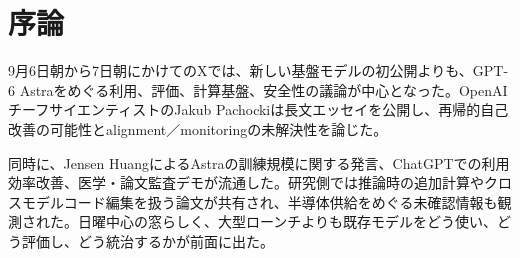 \section{序論}
9月6日朝から7日朝にかけてのXでは、新しい基盤モデルの初公開よりも、GPT-6 Astraをめぐる利用、評価、計算基盤、安全性の議論が中心となった。OpenAIチーフサイエンティストのJakub Pachockiは長文エッセイを公開し、再帰的自己改善の可能性とalignment／monitoringの未解決性を論じた。

同時に、Jensen HuangによるAstraの訓練規模に関する発言、ChatGPTでの利用効率改善、医学・論文監査デモが流通した。研究側では推論時の追加計算やクロスモデルコード編集を扱う論文が共有され、半導体供給をめぐる未確認情報も観測された。日曜中心の窓らしく、大型ローンチよりも既存モデルをどう使い、どう評価し、どう統治するかが前面に出た。
